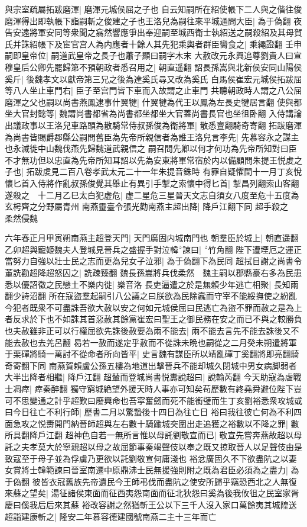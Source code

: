 與宗室疏屬拓跋磨渾|{
	磨渾元城侯屈之子也}
自云知嗣所在紹使帳下二人與之偕往俊磨渾得出即執帳下詣嗣斬之俊建之子也王洛兒為嗣往來平城通問大臣|{
	為于偽翻}
夜告安遠將軍安同等衆聞之翕然響應爭出奉迎嗣至城西衛士執紹送之嗣殺紹及其母賀氏并誅紹帳下及宦官宫人為内應者十餘人其先犯乘輿者群臣臠食之|{
	乘繩證翻}
壬申嗣即皇帝位|{
	嗣道武皇帝之長子也蕭子顯曰嗣字木末}
大赦改元永興追尊劉貴人曰宣穆皇后公卿先罷歸第不預朝政者悉召用之|{
	朝直遥翻}
詔長孫嵩與北新侯安同山陽侯奚斤|{
	後魏孝文以獻帝第三兄之後為達奚氏尋又改為奚氏}
白馬侯崔宏元城侯拓跋屈等八人坐止車門右|{
	臣子至宫門皆下車而入故謂之止車門}
共聽朝政時人謂之八公屈磨渾之父也嗣以尚書燕鳳逮事什翼犍|{
	什翼犍為代王以鳳為左長史犍居言翻}
使與都坐大官封懿等|{
	魏謂尚書都省為尚書都坐都坐大官蓋尚書長官也坐徂卧翻}
入侍講論出議政事以王洛兒車路頭為散騎常侍叔孫俊為衛將軍|{
	散悉亶翻騎奇寄翻}
拓跋磨渾為尚書皆賜爵郡縣公嗣問舊臣為先帝所親信者為誰王洛兒言李先|{
	先慕容永之謀主也永滅徙中山魏伐燕先歸魏道武親信之}
嗣召問先卿以何才何功為先帝所知對曰臣不才無功但以忠直為先帝所知耳詔以先為安東將軍常宿於内以備顧問朱提王悦䖍之子也|{
	拓跋䖍見二百八卷孝武太元二十一年朱提音銖時}
有罪自疑懼閏十一月丁亥悅懷匕首入侍將作亂叔孫俊覺其舉止有異引手掣之索懷中得匕首|{
	掣昌列翻索山客翻}
遂殺之　十二月乙巳太白犯虚危|{
	虚二星危三星晉天文志自須女八度至危十五度為玄枵齊之分野屬青州}
南燕靈臺令張光勸南燕主超出降|{
	降戶江翻下同}
超手殺之　柔然侵魏

六年春正月甲寅朔南燕主超登天門|{
	天門廣固内城南門也}
朝羣臣於城上|{
	朝直遥翻}
乙卯超與寵姬魏夫人登城見晉兵之盛握手對泣韓諫曰|{
	竹角翻}
陛下遭堙厄之運正當努力自強以壯士民之志而更為兒女子泣邪|{
	為于偽翻下為民同}
超拭目謝之尚書令董詵勸超降超怒囚之|{
	詵疎臻翻}
魏長孫嵩將兵伐柔然　魏主嗣以郡縣豪右多為民患悉以優詔徵之民戀土不樂内徙|{
	樂音洛}
長吏逼遣之於是無賴少年逃亡相聚|{
	長知兩翻少詩沼翻}
所在寇盜羣起嗣引八公議之曰朕欲為民除蠧而守宰不能綏撫使之紛亂今犯者既衆不可盡誅吾欲大赦以安之何如元城侯屈曰民逃亡為盜不罪而赦之是為上者反求於下也不如誅其首惡赦其餘黨崔宏曰聖王之御民務在安之而已不與之較勝負也夫赦雖非正可以行權屈欲先誅後赦要為兩不能去|{
	兩不能去言先不能去誅後又不能去赦也去羌呂翻}
曷若一赦而遂定乎赦而不從誅未晩也嗣從之二月癸未朔遣將軍于栗磾將騎一萬討不從命者所向皆平|{
	史言魏有謀臣所以靖亂磾丁奚翻將即亮翻騎奇寄翻下同}
南燕賀賴盧公孫五樓為地道出擊晉兵不能却城久閉城中男女病脚弱者大半出降者相繼|{
	降戶江翻}
超輦而登城尚書悦夀說超曰|{
	說輸芮翻}
今天助寇為虐戰士凋瘁|{
	瘁秦醉翻}
獨守窮城絶望外援天時人事亦可知矣苟歷數有終堯舜避位陛下豈可不思變通之計乎超歎曰廢興命也吾寜奮劒而死不能銜璧而生丁亥劉裕悉衆攻城或曰今日往亡不利行師|{
	歷書二月以驚蟄後十四日為往亡日}
裕曰我往彼亡何為不利四面急攻之悦夀開門納晉師超與左右數十騎踰城突圍出走追獲之裕數以不降之罪|{
	數所具翻降戶江翻}
超神色自若一無所言惟以母託劉敬宣而已|{
	敬宣先嘗奔燕故超以母託之夫孝莫大於寧親超以母之故屈節事秦竭聲伎以奉之既又掠取晉人以足聲伎由是致寇至于母子並為俘虜乃更欲以託劉敬宣何庸淺也}
裕忿廣固久不下欲盡阬之以妻女賞將士韓範諫曰晉室南遷中原鼎沸士民無援強則附之既為君臣必須為之盡力|{
	為于偽翻}
彼皆衣冠舊族先帝遺民今王師弔伐而盡阬之使安所歸乎竊恐西北之人無復來蘇之望矣|{
	湯征諸侯東面而征西夷怨南面而征北狄怨曰奚為後我攸徂之民室家胥慶曰傒我后后來其蘇}
裕改容謝之然猶斬王公以下三千人沒入家口萬餘夷其城隍送超詣建康斬之|{
	隆安二年慕容德建國號南燕二主十三年而亡}


